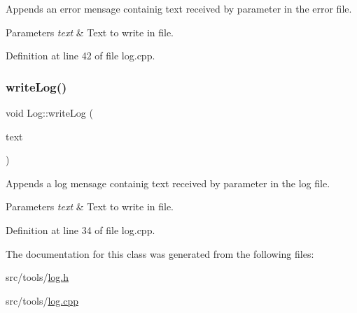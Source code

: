 Appends an error mensage containig text received by parameter in the error file. 


\begin{DoxyParams}{Parameters}
{\em text} & Text to write in file. \\
\hline
\end{DoxyParams}


Definition at line 42 of file log.\+cpp.

\mbox{\label{classLog_a1808c128874dd41cca3536ed5672df12}} 
\subsubsection{\texorpdfstring{write\+Log()}{writeLog()}}
{\footnotesize\ttfamily void Log\+::write\+Log (\begin{DoxyParamCaption}\item[{Q\+String}]{text }\end{DoxyParamCaption})\hspace{0.3cm}{\ttfamily [static]}}



Appends a log mensage containig text received by parameter in the log file. 


\begin{DoxyParams}{Parameters}
{\em text} & Text to write in file. \\
\hline
\end{DoxyParams}


Definition at line 34 of file log.\+cpp.



The documentation for this class was generated from the following files\+:\begin{DoxyCompactItemize}
\item 
src/tools/\mbox{\hyperlink{log_8h}{log.\+h}}\item 
src/tools/\mbox{\hyperlink{log_8cpp}{log.\+cpp}}\end{DoxyCompactItemize}
